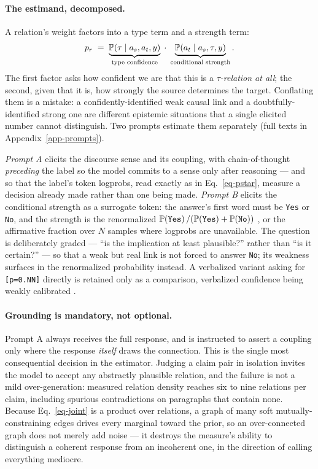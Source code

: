 \paragraph{The estimand, decomposed.} A relation's weight factors into a type term and a strength
term:
\begin{equation}
p_r \;=\; \underbrace{\mathbb{P}\!\left( \tau \mid a_s,a_t,y \right)}_{\text{type confidence}}\;\cdot\;
          \underbrace{\mathbb{P}\!\left( a_t \mid a_s,\tau,y \right)}_{\text{conditional strength}} .
\label{eq-decomp}
\end{equation}
The first factor asks how confident we are that this is a \emph{$\tau$-relation at all}; the second,
given that it is, how strongly the source determines the target. Conflating them is a mistake: a
confidently-identified weak causal link and a doubtfully-identified strong one are different
epistemic situations that a single elicited number cannot distinguish. Two prompts estimate them
separately (full texts in Appendix~\ref{app-prompts}).

\emph{Prompt A} elicits the discourse sense and its coupling, with chain-of-thought \emph{preceding}
the label so the model commits to a sense only after reasoning --- and so that the label's token
logprobs, read exactly as in Eq.~\ref{eq-pstar}, measure a decision already made rather than one
being made. \emph{Prompt B} elicits the conditional strength as a surrogate token: the answer's first
word must be \texttt{Yes} or \texttt{No}, and the strength is the renormalized
$\mathbb{P}\!\left( \texttt{Yes} \right)/(\mathbb{P}\!\left( \texttt{Yes} \right)+\mathbb{P}\!\left( \texttt{No} \right))$ \citep{kadavath}, or the affirmative
fraction over $N$ samples where logprobs are unavailable. The question is deliberately graded ---
``is the implication at least plausible?'' rather than ``is it certain?'' --- so that a weak but real
link is not forced to answer \texttt{No}; its weakness surfaces in the renormalized probability
instead. A verbalized variant asking for \texttt{[p=0.NN]} directly is retained only as a
comparison, verbalized confidence being weakly calibrated \citep{xiong}.

\paragraph{Grounding is mandatory, not optional.} Prompt A always receives the full response, and is
instructed to assert a coupling only where the response \emph{itself} draws the connection. This is
the single most consequential decision in the estimator. Judging a claim pair in isolation invites
the model to accept any abstractly plausible relation, and the failure is not a mild
over-generation: measured relation density reaches six to nine relations per claim, including
spurious contradictions on paragraphs that contain none. Because Eq.~\ref{eq-joint} is a product
over relations, a graph of many soft mutually-constraining edges drives every marginal toward the
prior, so an over-connected graph does not merely add noise --- it destroys the measure's ability to
distinguish a coherent response from an incoherent one, in the direction of calling everything
mediocre.

